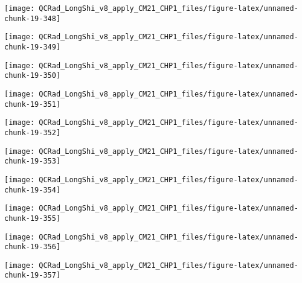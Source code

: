 \documentclass[
  10pt,
  a4paper,oneside]{article}
\begin{document}
\begin{center}\texttt{[image: QCRad\_LongShi\_v8\_apply\_CM21\_CHP1\_files/figure-latex/unnamed-chunk-19-348]} \end{center}

\begin{center}\texttt{[image: QCRad\_LongShi\_v8\_apply\_CM21\_CHP1\_files/figure-latex/unnamed-chunk-19-349]} \end{center}

\begin{center}\texttt{[image: QCRad\_LongShi\_v8\_apply\_CM21\_CHP1\_files/figure-latex/unnamed-chunk-19-350]} \end{center}

\begin{center}\texttt{[image: QCRad\_LongShi\_v8\_apply\_CM21\_CHP1\_files/figure-latex/unnamed-chunk-19-351]} \end{center}

\begin{center}\texttt{[image: QCRad\_LongShi\_v8\_apply\_CM21\_CHP1\_files/figure-latex/unnamed-chunk-19-352]} \end{center}

\begin{center}\texttt{[image: QCRad\_LongShi\_v8\_apply\_CM21\_CHP1\_files/figure-latex/unnamed-chunk-19-353]} \end{center}

\begin{center}\texttt{[image: QCRad\_LongShi\_v8\_apply\_CM21\_CHP1\_files/figure-latex/unnamed-chunk-19-354]} \end{center}

\begin{center}\texttt{[image: QCRad\_LongShi\_v8\_apply\_CM21\_CHP1\_files/figure-latex/unnamed-chunk-19-355]} \end{center}

\begin{center}\texttt{[image: QCRad\_LongShi\_v8\_apply\_CM21\_CHP1\_files/figure-latex/unnamed-chunk-19-356]} \end{center}

\begin{center}\texttt{[image: QCRad\_LongShi\_v8\_apply\_CM21\_CHP1\_files/figure-latex/unnamed-chunk-19-357]} \end{center}
\end{document}
